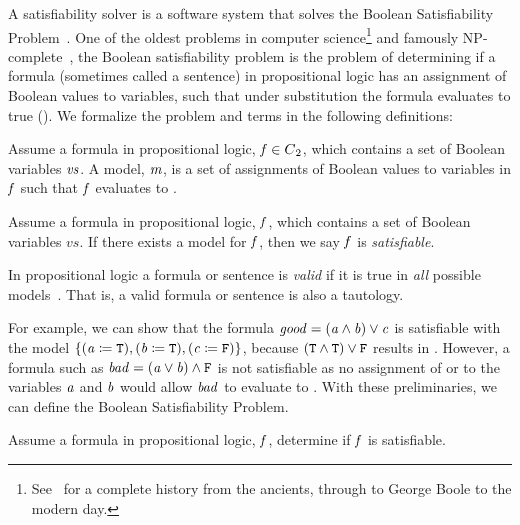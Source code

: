 \label{section:sat-solving}
%

A satisfiability solver is a software system that solves the Boolean
Satisfiability Problem~\cite{russelNorvig}. One of the oldest problems in
computer science\footnote{See~\citet{BBH+09} for a complete history from the
  ancients, through to George Boole to the modern day.} and famously
NP-complete~\cite{10.1145/800157.805047}, the Boolean satisfiability problem is
the problem of determining if a formula (sometimes called a sentence) in
propositional logic has an assignment of Boolean values to variables, such that
under substitution the formula evaluates to true (\tru{}). We formalize the
problem and terms in the following definitions:

\begin{definition}[Model]
  Assume a formula in propositional logic, $\mathit{f} \in {C\textsubscript{2}}{}$, which contains a
  set of Boolean variables $\mathit{vs}$. A model, $\mathit{m}$, is a set of assignments
  of Boolean values to variables in $\mathit{f}$ such that $\mathit{f}$ evaluates to
  \tru{}.
\end{definition}

\begin{definition}[Satisfiable]
  Assume a formula in propositional logic, $\mathit{f}$, which contains a set of
  Boolean variables $vs$. If there exists a model for $\mathit{f}$, then we say
  $\mathit{f}$ is \emph{satisfiable}.
\end{definition}
%
\begin{definition}[Validity]
  In propositional logic a formula or sentence is \emph{valid} if it is true in
  \emph{all} possible models~\cite{russelNorvig}. That is, a valid formula or
  sentence is also a tautology.
\end{definition}


For example, we can show that the formula $\mathit{good = (a \wedge b) \vee c}$ is
satisfiable with the model $\{\mathit{(a \coloneqq{}{} \texttt{T}{}), (b \coloneqq{}{} \texttt{T}{}), (c
  \coloneqq{}{} \texttt{F}{})}\}$, because $(\texttt{T}{} \wedge{} \texttt{T}{}) \vee{} \texttt{F}{}$
results in \tru{}. However, a formula such as $\mathit{bad = (a \vee b) \wedge
  \texttt{F}{}}$ is not satisfiable as no assignment of \fls{} or \tru{} to the
variables $\mathit{a}$ and $\mathit{b}$ would allow $\mathit{bad}$ to evaluate to \tru{}.
With these preliminaries, we can define the Boolean Satisfiability Problem.

\begin{definition}
  Assume a formula in propositional logic, $\mathit{f}$, determine if $\mathit{f}$ is
  satisfiable.~\cite{russelNorvig}
\end{definition}

